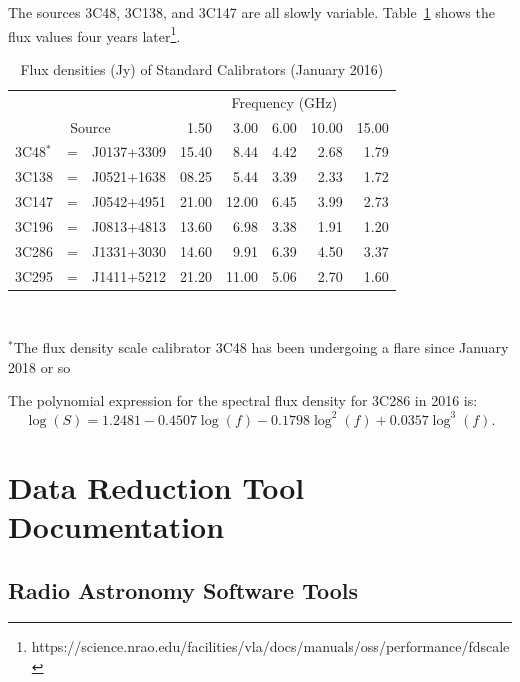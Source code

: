 \documentclass[letterpaper,11pt]{report}
\begin{document}
The sources 3C48, 3C138, and 3C147 are all slowly variable. 
Table~\ref{tab:fluxcal2} shows the flux values four years 
later\footnote{\ttfamily https://science.nrao.edu/facilities/vla/docs/manuals/oss/performance/fdscale}.
\begin{table}[h!tb]
    \begin{center}\label{tab:fluxcal2}
        \caption{Flux densities (Jy) of Standard Calibrators (January 2016)}
        \begin{tabular}{|lcl|rrrrr| }
            \hline       
            & &                    & \multicolumn{5}{c|}{Frequency (GHz)} \\
            \cline{4-8}
\multicolumn{3}{|c|}{Source} &  1.50 &   3.00 &	6.00 & 10.00 & 15.00 \\
3C48$^*$ &=& J0137+3309      & 15.40 &   8.44 & 4.42 &  2.68 & 1.79	\\
3C138    &=& J0521+1638      & 08.25 &   5.44 & 3.39 &  2.33 & 1.72	\\
3C147    &=& J0542+4951      & 21.00 &  12.00 & 6.45 &  3.99 & 2.73	\\
\hline
3C196    &=& J0813+4813      & 13.60 &   6.98 & 3.38 &  1.91 & 1.20	\\
3C286    &=& J1331+3030      & 14.60 &   9.91 & 6.39 &  4.50 & 3.37	\\
3C295    &=& J1411+5212      & 21.20 &  11.00 & 5.06 &  2.70 & 1.60	\\
\hline      
        \end{tabular}\\
    \end{center}
    $^*$The flux density scale calibrator 3C48 has been undergoing a flare 
    since January 2018 or so
\end{table}
The polynomial expression for the spectral flux density for 3C286 in 2016 is:
\begin{equation}
\log(S) = 1.2481 - 0.4507\log(f) - 0.1798\log^2(f) + 0.0357\log^3(f).
\end{equation}




\chapter{Data Reduction Tool Documentation}


\section{Radio Astronomy Software Tools}
\end{document}
